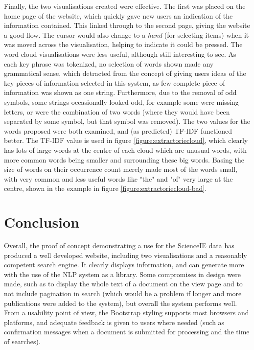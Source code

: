 Finally, the two visualisations created were effective. The first was placed on the home page of the website, which quickly gave new users an indication of the information contained. This linked through to the second page, giving the website a good flow. The cursor would also change to a \textit{hand} (for selecting items) when it was moved across the visualisation, helping to indicate it could be pressed. The word cloud visualisations were less useful, although still interesting to see. As each key phrase was tokenized, no selection of words shown made any grammatical sense, which detracted from the concept of giving users ideas of the key pieces of information selected in this system, as few complete piece of information was shown as one string. Furthermore, due to the removal of odd symbols, some strings occasionally looked odd, for example some were missing letters, or were the combination of two words (where they would have been separated by some symbol, but that symbol was removed). The two values for the words proposed were both examined, and (as predicted) TF-IDF functioned better. The TF-IDF value is used in figure \ref{figure:extractoriecloud}, which clearly has lots of large words at the centre of each cloud which are unusual words, with more common words being smaller and surrounding these big words. Basing the size of words on their occurrence count merely made most of the words small, with very common and less useful words like "the" and "of" very large at the centre, shown in the example in figure \ref{figure:extractoriecloud-bad}.

\section{Conclusion}
Overall, the proof of concept demonstrating a use for the ScienceIE data has produced a well developed website, including two visualisations and a reasonably competent search engine. It clearly displays information, and can generate more with the use of the NLP system as a library. Some compromises in design were made, such as to display the whole text of a document on the view page and to not include pagination in search (which would be a problem if longer and more publications were added to the system), but overall the system performs well. From a usability point of view, the Bootstrap styling supports most browsers and platforms, and adequate feedback is given to users where needed (such as confirmation messages when a document is submitted for processing and the time of searches).

